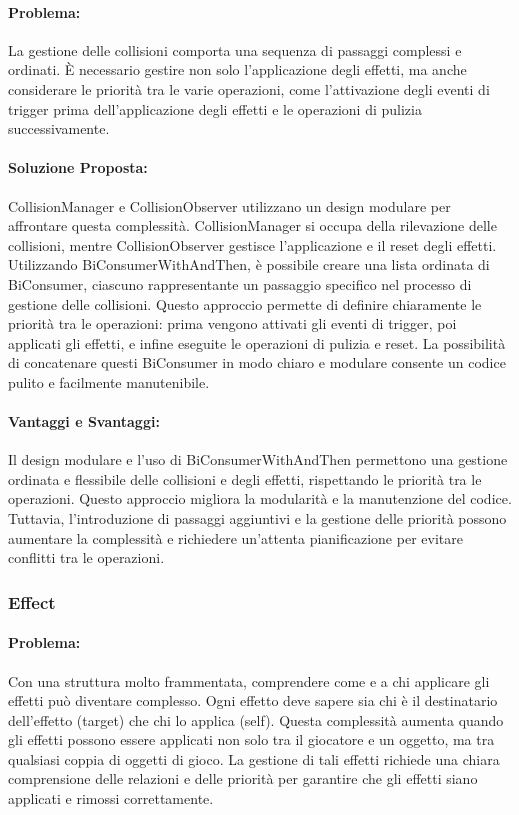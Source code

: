 \documentclass[a4paper,12pt]{report}
\begin{document}
\paragraph{Problema:} La gestione delle collisioni comporta una sequenza di passaggi complessi e ordinati. È necessario gestire non solo l’applicazione degli effetti, ma anche considerare le priorità tra le varie operazioni, come l’attivazione degli eventi di trigger prima dell’applicazione degli effetti e le operazioni di pulizia successivamente. 

\paragraph{Soluzione Proposta:}  CollisionManager e CollisionObserver utilizzano un design modulare per affrontare questa complessità. CollisionManager si occupa della rilevazione delle collisioni, mentre CollisionObserver gestisce l’applicazione e il reset degli effetti. Utilizzando BiConsumerWithAndThen, è possibile creare una lista ordinata di BiConsumer, ciascuno rappresentante un passaggio specifico nel processo di gestione delle collisioni. Questo approccio permette di definire chiaramente le priorità tra le operazioni: prima vengono attivati gli eventi di trigger, poi applicati gli effetti, e infine eseguite le operazioni di pulizia e reset. La possibilità di concatenare questi BiConsumer in modo chiaro e modulare consente un codice pulito e facilmente manutenibile.

\paragraph{Vantaggi e Svantaggi:}
Il design modulare e l’uso di BiConsumerWithAndThen permettono una gestione ordinata e flessibile delle collisioni e degli effetti, rispettando le priorità tra le operazioni. Questo approccio migliora la modularità e la manutenzione del codice. Tuttavia, l’introduzione di passaggi aggiuntivi e la gestione delle priorità possono aumentare la complessità e richiedere un’attenta pianificazione per evitare conflitti tra le operazioni.

\subsubsection{Effect}

\paragraph{Problema:} Con una struttura molto frammentata, comprendere come e a chi applicare gli effetti può diventare complesso. Ogni effetto deve sapere sia chi è il destinatario dell’effetto (target) che chi lo applica (self). Questa complessità aumenta quando gli effetti possono essere applicati non solo tra il giocatore e un oggetto, ma tra qualsiasi coppia di oggetti di gioco. La gestione di tali effetti richiede una chiara comprensione delle relazioni e delle priorità per garantire che gli effetti siano applicati e rimossi correttamente.
\end{document}
